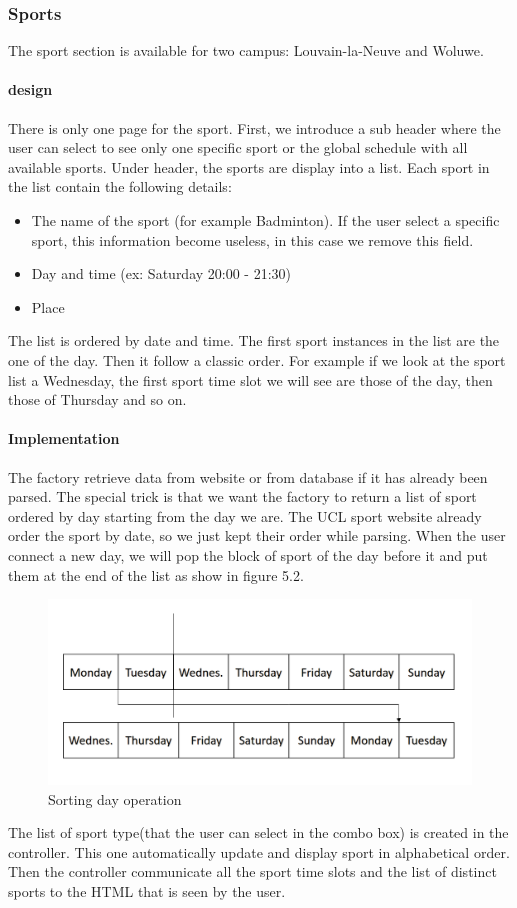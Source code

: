 \documentclass[11pt, a4paper]{report}
\begin{document}
\subsubsection{Sports}
The sport section is available for two campus: Louvain-la-Neuve and Woluwe. 
\paragraph{design}
There is only one page for the sport. First, we introduce a sub header where the user can select to see only one specific sport or the global schedule with all available sports. Under header, the sports are display into a list. Each sport in the list contain the following details:
\begin{itemize}
\item The name of the sport (for example Badminton). If the user select a specific sport, this information become useless, in this case we remove this field.
\item Day and time (ex: Saturday 20:00 - 21:30)
\item Place 
\end{itemize}
The list is ordered by date and time. The first sport instances in the list are the one of the day. Then it follow a classic order. For example if we look at the sport list a Wednesday, the first sport time slot we will see are those of the day, then those of Thursday and so on. 
\paragraph{Implementation}
The factory retrieve data from website or from database if it has already been parsed. The special trick is that we want the factory to return a list of sport ordered by day starting from the day we are. The UCL sport website already order the sport by date, so we just kept their order while parsing. When the user connect a new day, we will pop the block of sport of the day before it and put them at the end of the list as show in figure 5.2.
\begin{figure}
\centering
\includegraphics[scale = 0.3]{Images/sportsorting.png}
\caption{Sorting day operation}
\end{figure}
The list of sport type(that the user can select in the combo box) is created in the controller. This one automatically update and display sport in alphabetical order. Then the controller communicate all the sport time slots and the list of distinct sports to the HTML that is seen by the user. 
\end{document}
